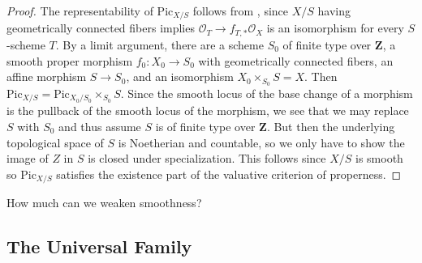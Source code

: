 \documentclass[12pt]{article}
\begin{document}
\begin{proof}
    The representability of $\mathrm{Pic}_{X/S}$ follows from \cite[\href{https://stacks.math.columbia.edu/tag/0D2C}{Tag 0D2C}]{stacks-project}, since $X/S$ having geometrically connected fibers implies  $\mathcal{O}_T \to f_{T,*}\mathcal{O}_X$ is an isomorphism for every $S$-scheme $T$. By a limit argument, there are a scheme $S_0$ of finite type over $\mathbf{Z}$, a smooth proper morphism $f_0: X_0 \to S_0$ with geometrically connected fibers, an affine morphism $S \to S_0$, and an isomorphism $X_0 \times _{S_0} S = X$. Then $\mathrm{Pic}_{X/S} = \mathrm{Pic}_{X_0/S_0} \times _{S_0} S$. Since the smooth locus of the base change of a morphism is the pullback of the smooth locus of the morphism, we see that we may replace $S$ with $S_0$ and thus assume $S$ is of finite type over $\mathbf{Z}$. But then the underlying topological space of $S$ is Noetherian and countable, so we only have to show the image of $Z$ in $S$ is closed under specialization. This follows since $X/S$ is smooth so $\mathrm{Pic}_{X/S}$ satisfies the existence part of the valuative criterion of properness.
\end{proof}

{\color{red} How much can we weaken smoothness?}

\subsection{The Universal Family}
\end{document}
